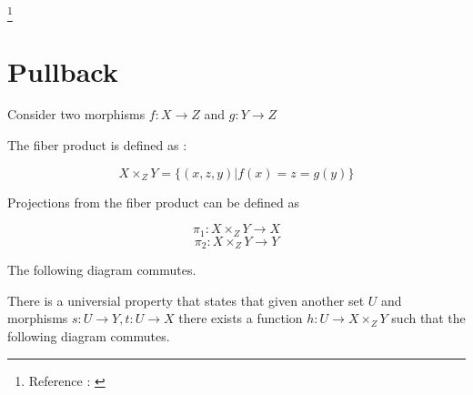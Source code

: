\documentclass[twoside]{article}
\begin{document}
\footnote{ Reference : \cite[Chapter~5]{awodey2006category} }

\section{Pullback}

Consider two morphisms $f : X \rightarrow Z $ and $g :  Y \rightarrow Z$

\begin{figure}[H]
       \centering
{}
\end{figure}

The fiber product is defined as :

$$ X \times_{Z} Y = \{ (x,z,y) | f(x) = z = g(y) \} $$

Projections from the fiber product can be defined as

$$ \pi_{1} : X \times_{Z} Y  \rightarrow X $$
$$ \pi_{2} : X \times_{Z} Y  \rightarrow Y $$

The following diagram commutes.

\begin{figure}[H]
       \centering
{}
\end{figure}

There is a universial property that states that given another
set $U$ and morphisms $s : U \rightarrow Y ,t : U \rightarrow X $
there exists a function $h : U \rightarrow X \times_{Z} Y$
such that the following diagram commutes.


\begin{figure}[H]
 \centering
\end{figure}
\end{document}
